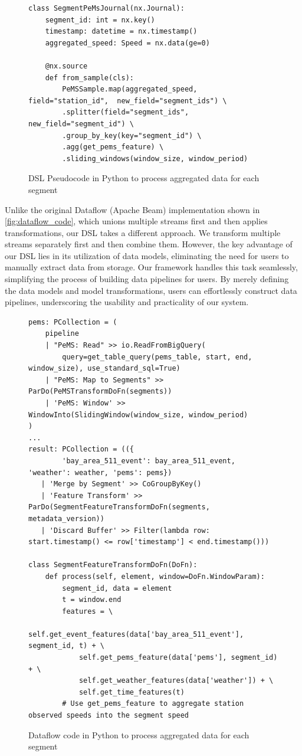 \begin{figure}[ht]
    \centering
\begin{verbatim}
class SegmentPeMsJournal(nx.Journal):
    segment_id: int = nx.key()
    timestamp: datetime = nx.timestamp()
    aggregated_speed: Speed = nx.data(ge=0)

    @nx.source
    def from_sample(cls):
        PeMSSample.map(aggregated_speed, field="station_id",  new_field="segment_ids") \
        .splitter(field="segment_ids", new_field="segment_id") \
        .group_by_key(key="segment_id") \
        .agg(get_pems_feature) \
        .sliding_windows(window_size, window_period)
\end{verbatim}
    \caption{DSL Pseudocode in Python to process aggregated data for each segment}
    \label{fig:dsl_code}
\end{figure}




Unlike the original Dataflow (Apache Beam) implementation shown in \autoref{fig:dataflow_code}, which unions multiple streams first and then applies transformations, our DSL takes a different approach. We transform multiple streams separately first and then combine them. However, the key advantage of our DSL lies in its utilization of data models, eliminating the need for users to manually extract data from storage. Our framework handles this task seamlessly, simplifying the process of building data pipelines for users. By merely defining the data models and model transformations, users can effortlessly construct data pipelines, underscoring the usability and practicality of our system.

\begin{figure}
    \begin{verbatim}
pems: PCollection = (
    pipeline
    | "PeMS: Read" >> io.ReadFromBigQuery(
        query=get_table_query(pems_table, start, end, window_size), use_standard_sql=True)
    | "PeMS: Map to Segments" >> ParDo(PeMSTransformDoFn(segments))
    | 'PeMS: Window' >> WindowInto(SlidingWindow(window_size, window_period)
)
...
result: PCollection = (({
        'bay_area_511_event': bay_area_511_event, 'weather': weather, 'pems': pems})
   | 'Merge by Segment' >> CoGroupByKey()
   | 'Feature Transform' >> ParDo(SegmentFeatureTransformDoFn(segments, metadata_version))
   | 'Discard Buffer' >> Filter(lambda row: start.timestamp() <= row['timestamp'] < end.timestamp()))

class SegmentFeatureTransformDoFn(DoFn):
    def process(self, element, window=DoFn.WindowParam):
        segment_id, data = element
        t = window.end
        features = \ 
            self.get_event_features(data['bay_area_511_event'], segment_id, t) + \
            self.get_pems_feature(data['pems'], segment_id) + \
            self.get_weather_features(data['weather']) + \
            self.get_time_features(t)
        # Use get_pems_feature to aggregate station observed speeds into the segment speed
\end{verbatim}
    \caption{Dataflow code in Python to process aggregated data for each segment}
    \label{fig:dataflow_code}
\end{figure}

